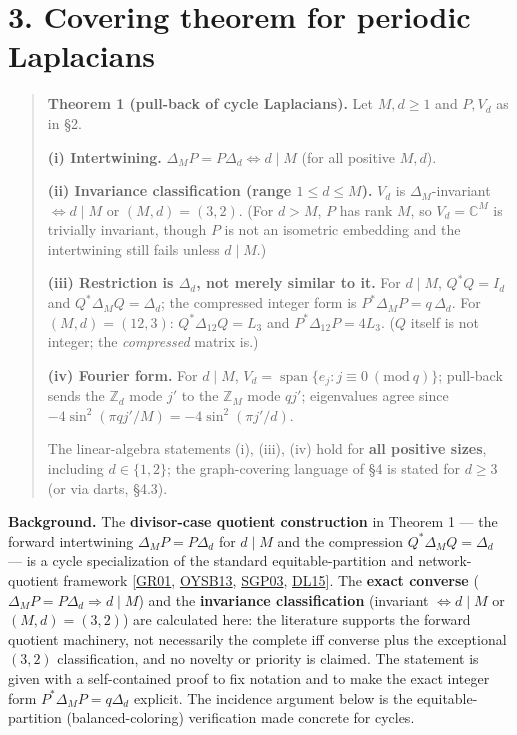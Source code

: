 \documentclass[
  11pt,
  a4paper,
]{article}
\begin{document}
\section{3. Covering theorem for periodic Laplacians}\label{covering-theorem-for-periodic-laplacians}

\begin{quote}
\textbf{Theorem 1 (pull-back of cycle Laplacians).} Let \(M,d\ge1\) and \(P,V_d\) as in §2.

\textbf{(i) Intertwining.} \(\Delta_M P=P\Delta_d\iff d\mid M\) (for all positive \(M,d\)).

\textbf{(ii) Invariance classification (range \(1\le d\le M\)).} \(V_d\) is \(\Delta_M\)-invariant \(\iff d\mid M\) or \((M,d)=(3,2)\). (For \(d>M\), \(P\) has rank \(M\), so \(V_d=\mathbb C^M\) is trivially invariant, though \(P\) is not an isometric embedding and the intertwining still fails unless \(d\mid M\).)

\textbf{(iii) Restriction is \(\Delta_d\), not merely similar to it.} For \(d\mid M\), \(Q^\ast Q=I_d\) and \(Q^\ast\Delta_M Q=\Delta_d\); the compressed integer form is \(P^\ast\Delta_M P=q\,\Delta_d\). For \((M,d)=(12,3)\): \(Q^\ast\Delta_{12}Q=L_3\) and \(P^\ast\Delta_{12}P=4L_3\). (\(Q\) itself is not integer; the \emph{compressed} matrix is.)

\textbf{(iv) Fourier form.} For \(d\mid M\), \(V_d=\operatorname{span}\{e_j: j\equiv0\ (\mathrm{mod}\ q)\}\); pull-back sends the \(\mathbb Z_d\) mode \(j'\) to the \(\mathbb Z_M\) mode \(qj'\); eigenvalues agree since \(-4\sin^2(\pi qj'/M)=-4\sin^2(\pi j'/d)\).

The linear-algebra statements (i), (iii), (iv) hold for \textbf{all positive sizes}, including \(d\in\{1,2\}\); the graph-covering language of §4 is stated for \(d\ge3\) (or via darts, §4.3).
\end{quote}

\textbf{Background.} The \textbf{divisor-case quotient construction} in Theorem 1 --- the forward intertwining \(\Delta_M P=P\Delta_d\) for \(d\mid M\) and the compression \(Q^\ast\Delta_M Q=\Delta_d\) --- is a cycle specialization of the standard equitable-partition and network-quotient framework {[}\hyperlink{ref-GR01}{GR01}, \hyperlink{ref-OYSB13}{OYSB13}, \hyperlink{ref-SGP03}{SGP03}, \hyperlink{ref-DL15}{DL15}{]}. The \textbf{exact converse} (\(\Delta_M P=P\Delta_d\Rightarrow d\mid M\)) and the \textbf{invariance classification} (invariant \(\iff d\mid M\) or \((M,d)=(3,2)\)) are calculated here: the literature supports the forward quotient machinery, not necessarily the complete iff converse plus the exceptional \((3,2)\) classification, and no novelty or priority is claimed. The statement is given with a self-contained proof to fix notation and to make the exact integer form \(P^\ast\Delta_M P=q\Delta_d\) explicit. The incidence argument below is the equitable-partition (balanced-coloring) verification made concrete for cycles.
\end{document}

